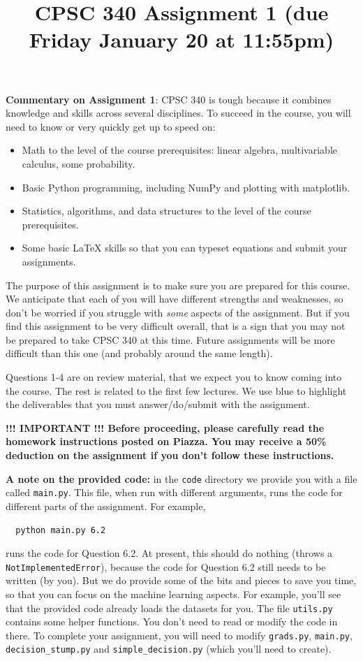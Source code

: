 \documentclass{article}
\def\blu#1{{\color{blu}#1}}
\begin{document}
\title{CPSC 340 Assignment 1 (due Friday January 20 at 11:55pm)}
\date{}
\maketitle
\vspace{-4em}

\textbf{Commentary on Assignment 1}: CPSC 340 is tough because it combines knowledge and skills across several disciplines. To succeed
in the course, you will need to know or very quickly get up to speed on:
\begin{itemize}
\item Math to the level of the course prerequisites: linear algebra, multivariable calculus, some probability.
\item Basic Python programming, including NumPy and plotting with matplotlib.
\item Statistics, algorithms, and data structures to the level of the course prerequisites.
\item Some basic LaTeX skills so that you can typeset equations and submit your assignments.
\end{itemize}

The purpose of this assignment is to make sure you are prepared for this course. We anticipate that each
of you will have different strengths and weaknesses, so don't be worried if you struggle with \emph{some} aspects
of the assignment. But if you find this assignment
to be very difficult overall, that is a sign that you may not be prepared to take CPSC 340
at this time. Future assignments will be more difficult than this one (and probably around the same length).

Questions 1-4 are on review material, that we expect you to know coming into the course. The rest is related to the first few lectures.
We use \blu{blue} to highlight the deliverables that you must answer/do/submit with the assignment.

\textbf{!!! IMPORTANT !!! Before proceeding, please carefully read the homework instructions posted on Piazza. You may receive a 50\% deduction on the assignment if you don't follow these instructions.}

\textbf{A note on the provided code:} in the \texttt{code} directory we provide you with a file called
  \texttt{main.py}. This file, when run with different arguments, runs the code for different
  parts of the assignment. For example,
  \begin{verbatim}
  python main.py 6.2
  \end{verbatim}
  runs the code for Question 6.2. At present, this should do nothing (throws a \texttt{NotImplementedError}), because the code
  for Question 6.2 still needs to be written (by you). But we do provide some of the bits
  and pieces to save you time, so that you can focus on the machine learning aspects.
  For example, you'll see that the provided code already loads the datasets for you.
  The file \texttt{utils.py} contains some helper functions.
  You don't need to read or modify the code in there.
  To complete your assignment, you will need to modify \texttt{grads.py}, \texttt{main.py}, \texttt{decision\string_stump.py} and \texttt{simple\string_decision.py} (which you'll need to create).
\end{document}
